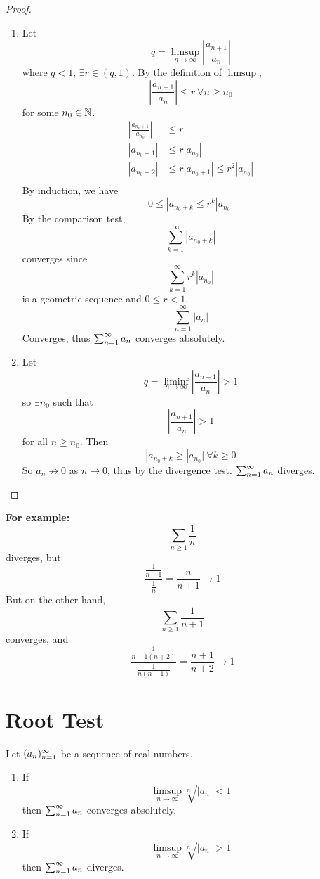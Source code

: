 \documentclass[openany]{report}
\begin{document}
\begin{proof}
    ~\newline
    \begin{enumerate}[label=(\roman*)]
        \item Let 
        \[q = \limsup_{n\rightarrow \infty} \left| \frac{a_{n+1}}{a_n} \right|\]
        where $q < 1$, $\exists r \in (q,1)$. By the definition of $\limsup$, 
        \[\left| \frac{a_{n+1}}{a_n} \right| \leq r \ \forall n \geq n_0\]
        for some $n_0 \in \mathbb{N}$.
        \begin{align*}
            \left| \frac{a_{n_0+1}}{a_{n_0}} \right| &\leq r\\
            \left| a_{n_0+1} \right| &\leq r|a_{n_0}|\\
            \left| a_{n_0+2} \right| &\leq r|a_{n_0+1}| \leq r^2|a_{n_0}|\\
        \end{align*}
        By induction, we have
        \[0 \leq |a_{n_0 + k} \leq r^k |a_{n_0}|\]
        By the comparison test, 
        \[\sum_{k=1}^\infty |a_{n_0+ k}|\]
        converges since 
        \[\sum_{k=1}^\infty r^k|a_{n_0}|\]
        is a geometric sequence and $0 \leq r < 1$. 
        \[\sum_{n=1}^\infty |a_n|\]
        Converges, thus $\sum_{n=1}^\infty a_n$ converges absolutely.
        \item Let 
        \[q = \liminf_{n \rightarrow \infty} \left| \frac{a_{n+1}}{a_n}\right| > 1\]
        so $\exists n_0$ such that 
        \[\left| \frac{a_{n+1}}{a_{n}} \right| > 1\]
        for all $n \geq n_0$. Then
        \[|a_{n_0 + k} \geq |a_{n_0}| \ \forall k \geq 0 \]
        So $a_n \not\rightarrow 0$ as $n \rightarrow 0$, thus by the divergence test. $\sum_{n=1}^\infty a_n$ diverges.
    \end{enumerate}
\end{proof}

\begin{center}
\end{center}
\textbf{For example:} 
\[\sum_{n\geq 1} \frac{1}{n}\]
diverges, but 
\[\frac{\frac{1}{n+1}}{\frac{1}{n}} = \frac{n}{n+1} \rightarrow 1\]
But on the other hand, 
\[\sum_{n\geq1} \frac{1}{n+1}\]
converges, and 
\[\frac{\frac{1}{n+1(n+2)}}{\frac{1}{n(n+1)}} = \frac{n+1}{n+2} \rightarrow 1\]
\section{Root Test}
\begin{prop}
    Let $({a}_n)_{n=1}^\infty$ be a sequence of real numbers.
    \begin{enumerate}[label=(\roman*)]
        \item If 
        \[\limsup_{n\rightarrow \infty} \sqrt[n]{|a_n|} < 1\]
        then $\sum_{n=1}^\infty a_n$ converges absolutely.
        \item If 
        \[\limsup_{n\rightarrow \infty} \sqrt[n]{|a_n|} > 1\]
        then $\sum_{n=1}^\infty a_n$ diverges.
    \end{enumerate}
\end{prop}
\end{document}
